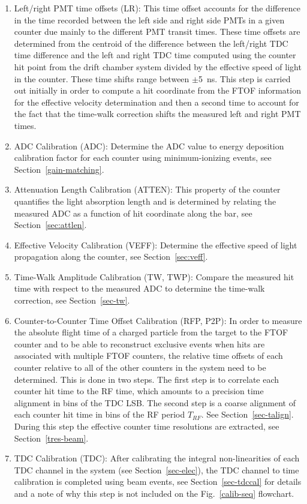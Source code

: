 \documentclass{elsart}
\begin{document}
\begin{enumerate}
\item Left/right PMT time offsets (LR): This time offset accounts for the difference in the time recorded
between the left side and right side PMTs in a given counter due mainly to the different PMT transit times.
These time offsets are determined from the centroid of the difference between the left/right TDC time
difference and the left and right TDC time computed using the counter hit point from the drift chamber
system divided by the effective speed of light in the counter. These time shifts range between $\pm$5~ns.
This step is carried out initially in order to compute a hit coordinate from the FTOF information for the
effective velocity determination and then a second time to account for the fact that the time-walk correction
shifts the measured left and right PMT times.

\item ADC Calibration (ADC): Determine the ADC value to energy deposition calibration factor for each counter
using minimum-ionizing events, see Section~\ref{gain-matching}.

\item Attenuation Length Calibration (ATTEN): This property of the counter quantifies the light absorption length
and is determined by relating the measured ADC as a function of hit coordinate along the bar, see
Section~\ref{sec:attlen}.

\item Effective Velocity Calibration (VEFF): Determine the effective speed of light propagation along the counter,
see Section~\ref{sec:veff}.

\item Time-Walk Amplitude Calibration (TW, TWP): Compare the measured hit time with respect to the measured
ADC to determine the time-walk correction, see Section~\ref{sec-tw}.
  
\item Counter-to-Counter Time Offset Calibration (RFP, P2P): In order to measure the absolute flight time of a
charged particle from the target to the FTOF counter and to be able to reconstruct exclusive events when hits
are associated with multiple FTOF counters, the relative time offsets of each counter relative to all of the other
counters in the system need to be determined. This is done in two steps. The first step is to correlate each counter
hit time to the RF time, which amounts to a precision time alignment in bins of the TDC LSB. The second step is a
coarse alignment of each counter hit time in bins of the RF period $T_{RF}$. See Section~\ref{sec-talign}. During
this step the effective counter time resolutions are extracted, see Section~\ref{tres-beam}.

\item TDC Calibration (TDC): After calibrating the integral non-linearities of each TDC channel in the system
(see Section~\ref{sec-elec}), the TDC channel to time calibration is completed using beam events, see
Section~\ref{sec-tdccal} for details and a note of why this step is not included on the Fig.~\ref{calib-seq}
flowchart.

\end{enumerate}
\end{document}
